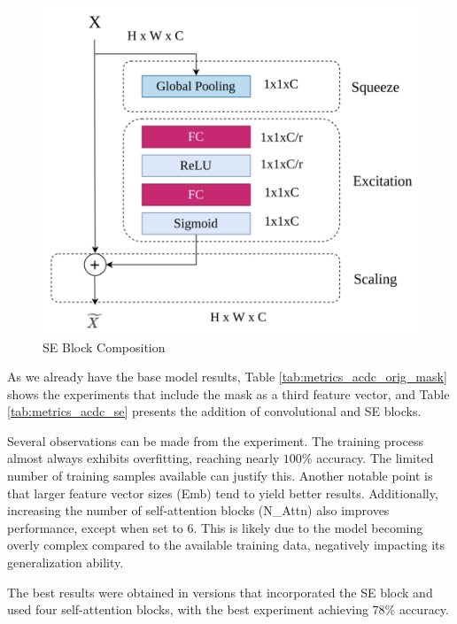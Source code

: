 \documentclass[journal,twoside,web]{ieeecolor}
\begin{document}
\begin{figure}[h]
    \centerline{\includegraphics[width=\columnwidth]{figures/fig06.png}}
    \caption{SE Block Composition}
    \label{fig06}
\end{figure}

As we already have the base model results,  Table \ref{tab:metrics_acdc_orig_mask} shows the experiments that include the mask as a third feature vector, and Table \ref{tab:metrics_acdc_se} presents the addition of convolutional and \gls{SE} blocks.  

Several observations can be made from the experiment. The training process almost always exhibits overfitting, reaching nearly $100$\% accuracy. The limited number of training samples available can justify this. Another notable point is that larger feature vector sizes (Emb) tend to yield better results. Additionally, increasing the number of self-attention blocks (N\_Attn) also improves performance, except when set to 6. This is likely due to the model becoming overly complex compared to the available training data, negatively impacting its generalization ability.  

The best results were obtained in versions that incorporated the \gls{SE} block and used four self-attention blocks, with the best experiment achieving $78$\% accuracy.
\end{document}
